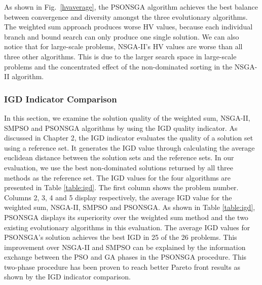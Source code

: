 \documentclass[10pt,journal,compsoc]{IEEEtran}
\newcommand{\Fig}[1]{Fig.~\ref{#1}}
\begin{document}
As shown in \Fig{hvaverage}, the PSONSGA algorithm achieves the best balance between convergence and diversity amongst the three evolutionary algorithms. The weighted sum approach produces worse HV values, because each individual branch and bound search can only produce one single solution. We can also notice that for large-scale problems, NSGA-II's HV values are worse than all three other algorithms. This is due to the larger search space in large-scale problems and the concentrated effect of the non-dominated sorting in the NSGA-II algorithm.
\subsubsection{IGD Indicator Comparison}

In this section, we examine the solution quality of the weighted sum, NSGA-II, SMPSO and PSONSGA algorithms by using the IGD quality indicator. As discussed in Chapter 2, the IGD indicator evaluates the quality of a solution set using a reference set. It generates the IGD value through calculating the average euclidean distance between the solution sets and the reference sets. In our evaluation, we use the best non-dominated solutions returned by all three methods as the reference set. The IGD values for the four algorithms are presented in Table \ref{table:igd}. The first column shows the problem number. Columns 2, 3, 4 and 5 display respectively, the average IGD value for the weighted sum, NSGA-II, SMPSO and PSONSGA. 
As shown in Table \ref{table:igd}, PSONSGA displays its superiority over the weighted sum method and the two existing evolutionary algorithms in this evaluation. The average IGD values for PSONSGA's solution achieves the best IGD in 25 of the 26 problems. This improvement over NSGA-II and SMPSO can be explained by the information exchange between the PSO and GA phases in the PSONSGA procedure. %
This two-phase procedure has been proven to reach better Pareto front results as shown by the IGD indicator comparison.
\end{document}
